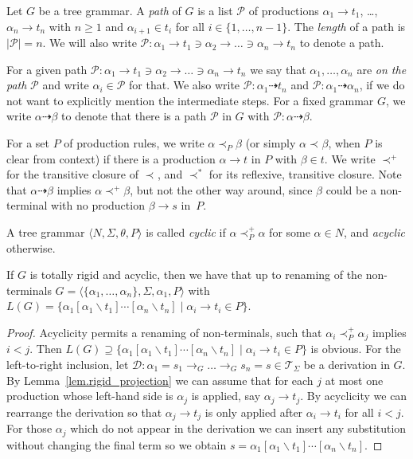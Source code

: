 \documentclass{LMCS}
\theoremstyle{plain}
\theoremstyle{definition}
\def\set#1{\{#1\}}
\def\tuple#1{\langle#1\rangle}
\newcommand{\sop}{[}
\newcommand{\scl}{]}
\newcommand{\sel}[2]{#1 \backslash #2}
\newcommand{\unsubst}[2]{\sop \sel{#1}{#2} \scl}
\newcommand{\Lang}[1]{L(#1)}	\newcommand{\Gram}[1]{\mathrm{G}(#1)}	\newcommand{\Gramreg}[1]{\mathrm{G}_0(#1)}
\newcommand{\TR}[1]{\mathcal{T}_{#1}}
\newcommand{\DD}{\mathcal{D}}
\newcommand{\PP}{\mathcal{P}}
\newcommand{\derel}[1]{\mathbin{\rightarrow_{#1}}}
\newcommand{\sreach}[1]{\mathbin{\prec_{#1}^*}}
\newcommand{\preach}[1]{\mathbin{\prec_{#1}^+}}
\newcommand{\reach}[1]{\mathbin{\prec_{#1}}}
\newcommand{\pathto}[1][]{\mathbin{\stackrel{#1}{\dashrightarrow}}}
\newcommand{\length}[1]{\left|#1\right|}
\begin{document}
\begin{defi}
  Let $G$ be a tree grammar. A \emph{path} of $G$ is a list $\PP$ of
  productions $\alpha_1\to t_1$, \ldots, $\alpha_n\to t_n$ with
  $n\geq1$ and $\alpha_{i+1}\in t_i$ for all
  $i\in\set{1,\ldots,n-1}$. The \emph{length} of a path is
  $\length{\PP}=n$.  We will also write $\PP\colon\alpha_1\to
  t_1\ni\alpha_2\to\ldots\ni\alpha_n\to t_n$ to denote a path.
\end{defi}

For a given path $\PP\colon\alpha_1\to
t_1\ni\alpha_2\to\ldots\ni\alpha_n\to t_n$ we say that
$\alpha_1,\ldots,\alpha_n$ are \emph{on the path} $\PP$ and write
$\alpha_i\in\PP$ for that. We also write
$\PP\colon\alpha_1\pathto t_n$ and $\PP\colon\alpha_1\pathto\alpha_n$,
if we do not want to explicitly mention the intermediate steps.  For
a fixed grammar $G$, we write $\alpha\pathto\beta$ to denote that
there is a path $\PP$ in $G$ with $\PP\colon\alpha\pathto\beta$.  

For a set $P$ of production rules, we write $\alpha\reach{P}\beta$ (or
simply $\alpha\reach{}\beta$, when $P$ is clear from context) if there
is a production $\alpha\to t$ in $P$ with $\beta\in t$. We write
$\preach{}$ for the transitive closure of $\reach{}$, and $\sreach{}$
for its reflexive, transitive closure. Note that $\alpha\pathto\beta$
implies $\alpha\preach{}\beta$, but not the other way around, since
$\beta$ could be a non-terminal with no production $\beta\to s$
in~$P$.

\begin{defi}
  A tree grammar $\tuple{N,\Sigma,\theta,P}$ is called \emph{cyclic} if
  $\alpha\preach{P}\alpha$ for some $\alpha\in N$, and
  \emph{acyclic} otherwise.
\end{defi}

\begin{lem}\label{lem.totrig_acyclic_language}
  If $G$ is totally rigid and acyclic, then we have that up to renaming of the
  non-terminals
  $G=\tuple{\set{\alpha_1,\ldots,\alpha_n},\Sigma,\alpha_1,P}$ with
  $\Lang{G}=\set{\alpha_1\unsubst{\alpha_1}{t_1}\cdots\unsubst{\alpha_n}{t_n}
    \mid \alpha_i \rightarrow t_i \in P}$.
\end{lem}

\begin{proof}
  Acyclicity permits a renaming of non-terminals, such that
  $\alpha_i\preach{P}\alpha_j$ implies $i<j$. Then $\Lang{G}\supseteq
  \set{\alpha_1\unsubst{\alpha_1}{t_1}\cdots\unsubst{\alpha_n}{t_n}
    \mid \alpha_i \rightarrow t_i \in P}$ is obvious. For the
  left-to-right inclusion, let
  $\DD\colon\alpha_1=s_1\derel{G}\ldots\derel{G}s_n=s\in\TR{\Sigma}$
  be a derivation in $G$. By Lemma~\ref{lem.rigid_projection} we can
  assume that for each $j$ at most one production whose left-hand side
  is $\alpha_j$ is applied, say $\alpha_j\rightarrow t_j$. By
  acyclicity we can rearrange the derivation so that
  $\alpha_j\rightarrow t_j$ is only applied after $\alpha_i\rightarrow
  t_i$ for all $i<j$.  For those $\alpha_j$ which do not appear in the
  derivation we can insert any substitution without changing the final
  term so we obtain
  $s=\alpha_1\unsubst{\alpha_1}{t_1}\cdots\unsubst{\alpha_n}{t_n}$.
\end{proof}
\end{document}
